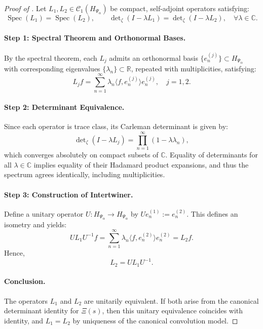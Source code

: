 \begin{proof}[Proof of ]
Let \( L_1, L_2 \in \mathcal{C}_1(H_{\Psi_\alpha}) \) be compact, self-adjoint operators satisfying:
\[
\operatorname{Spec}(L_1) = \operatorname{Spec}(L_2), \qquad
\det\nolimits_\zeta(I - \lambda L_1) = \det\nolimits_\zeta(I - \lambda L_2), \quad \forall \lambda \in \mathbb{C}.
\]

\paragraph{Step 1: Spectral Theorem and Orthonormal Bases.}
By the spectral theorem, each \( L_j \) admits an orthonormal basis \( \{e_n^{(j)}\} \subset H_{\Psi_\alpha} \) with corresponding eigenvalues \( \{\lambda_n\} \subset \mathbb{R} \), repeated with multiplicities, satisfying:
\[
L_j f = \sum_{n=1}^\infty \lambda_n \langle f, e_n^{(j)} \rangle e_n^{(j)}, \quad j = 1,2.
\]

\paragraph{Step 2: Determinant Equivalence.}
Since each operator is trace class, its Carleman determinant is given by:
\[
\det\nolimits_\zeta(I - \lambda L_j) = \prod_{n=1}^\infty (1 - \lambda \lambda_n),
\]
which converges absolutely on compact subsets of \( \mathbb{C} \). Equality of determinants for all \( \lambda \in \mathbb{C} \) implies equality of their Hadamard product expansions, and thus the spectrum agrees identically, including multiplicities.

\paragraph{Step 3: Construction of Intertwiner.}
Define a unitary operator \( U \colon H_{\Psi_\alpha} \to H_{\Psi_\alpha} \) by \( U e_n^{(1)} := e_n^{(2)} \). This defines an isometry and yields:
\[
U L_1 U^{-1} f = \sum_{n=1}^\infty \lambda_n \langle f, e_n^{(2)} \rangle e_n^{(2)} = L_2 f.
\]
Hence,
\[
L_2 = U L_1 U^{-1}.
\]

\paragraph{Conclusion.}
The operators \( L_1 \) and \( L_2 \) are unitarily equivalent. If both arise from the canonical determinant identity for \( \Xi(s) \), then this unitary equivalence coincides with identity, and \( L_1 = L_2 \) by uniqueness of the canonical convolution model.
\end{proof}
